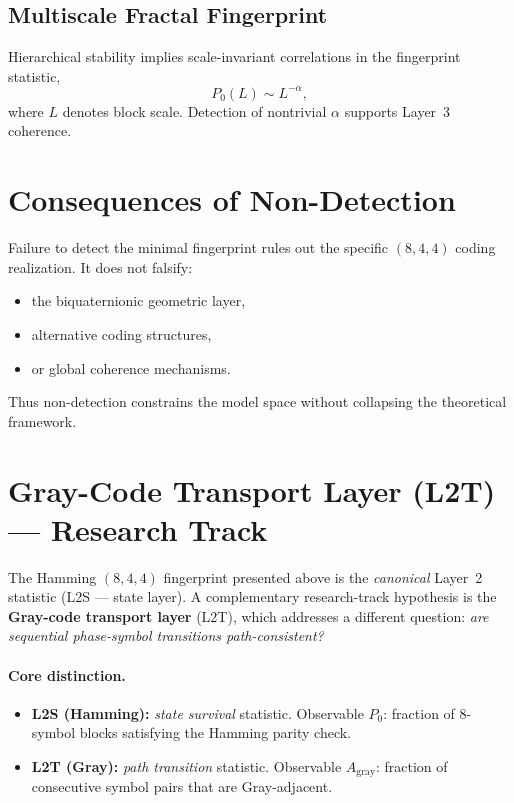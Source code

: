 \documentclass[11pt]{article}
\begin{document}
\subsection{Multiscale Fractal Fingerprint}

Hierarchical stability implies scale-invariant correlations in the
fingerprint statistic,
\begin{equation}
P_0(L) \sim L^{-\alpha},
\end{equation}
where $L$ denotes block scale. Detection of nontrivial $\alpha$ supports
Layer~3 coherence.

\section{Consequences of Non-Detection}

Failure to detect the minimal fingerprint rules out the specific
$(8,4,4)$ coding realization. It does not falsify:
\begin{itemize}
\item the biquaternionic geometric layer,
\item alternative coding structures,
\item or global coherence mechanisms.
\end{itemize}

Thus non-detection constrains the model space without collapsing the
theoretical framework.

\section{Gray-Code Transport Layer (L2T) — Research Track}
\label{sec:gray_transport}

The Hamming $(8,4,4)$ fingerprint presented above is the \emph{canonical} Layer~2
statistic (L2S — state layer). A complementary research-track hypothesis is the
\textbf{Gray-code transport layer} (L2T), which addresses a different question:
\emph{are sequential phase-symbol transitions path-consistent?}

\paragraph{Core distinction.}
\begin{itemize}
\item \textbf{L2S (Hamming):} \emph{state survival} statistic.
  Observable $P_0$: fraction of 8-symbol blocks satisfying the Hamming parity check.
\item \textbf{L2T (Gray):} \emph{path transition} statistic.
  Observable $A_{\mathrm{gray}}$: fraction of consecutive symbol pairs that are
  Gray-adjacent.
\end{itemize}
\end{document}
